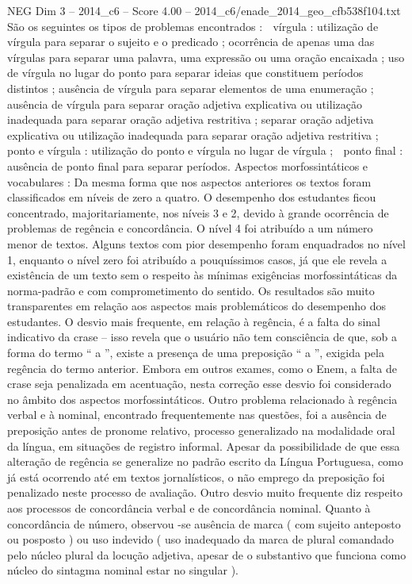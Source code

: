 \begin{textsample}{NEG Dim 3 – 2014\_c6 – Score 4.00 – 2014\_c6/enade\_2014\_geo\_cfb538f104.txt}
São os seguintes os tipos de problemas encontrados :  vírgula : utilização de vírgula para separar o sujeito e o predicado ; ocorrência de apenas uma das vírgulas para separar uma palavra, uma expressão ou uma oração encaixada ; uso de vírgula no lugar do ponto para separar ideias que constituem períodos distintos ; ausência de vírgula para separar elementos de uma enumeração ; ausência de vírgula para separar oração adjetiva explicativa ou utilização inadequada para separar oração adjetiva restritiva ; separar oração adjetiva explicativa ou utilização inadequada para separar oração adjetiva restritiva ;  ponto e vírgula : utilização do ponto e vírgula no lugar de vírgula ;  ponto final : ausência de ponto final para separar períodos.
Aspectos morfossintáticos e vocabulares : Da mesma forma que nos aspectos anteriores os textos foram classificados em níveis de zero a quatro.
O desempenho dos estudantes ficou concentrado, majoritariamente, nos níveis 3 e 2, devido à grande ocorrência de problemas de regência e concordância.
O nível 4 foi atribuído a um número menor de textos.
Alguns textos com pior desempenho foram enquadrados no nível 1, enquanto o nível zero foi atribuído a pouquíssimos casos, já que ele revela a existência de um texto sem o respeito às mínimas exigências morfossintáticas da norma-padrão e com comprometimento do sentido.
Os resultados são muito transparentes em relação aos aspectos mais problemáticos do desempenho dos estudantes.
O desvio mais frequente, em relação à regência, é a falta do sinal indicativo da crase – isso revela que o usuário não tem consciência de que, sob a forma do termo “ a ”, existe a presença de uma preposição “ a ”, exigida pela regência do termo anterior.
Embora em outros exames, como o Enem, a falta de crase seja penalizada em acentuação, nesta correção esse desvio foi considerado no âmbito dos aspectos morfossintáticos.
Outro problema relacionado à regência verbal e à nominal, encontrado frequentemente nas questões, foi a ausência de preposição antes de pronome relativo, processo generalizado na modalidade oral da língua, em situações de registro informal.
Apesar da possibilidade de que essa alteração de regência se generalize no padrão escrito da Língua Portuguesa, como já está ocorrendo até em textos jornalísticos, o não emprego da preposição foi penalizado neste processo de avaliação.
Outro desvio muito frequente diz respeito aos processos de concordância verbal e de concordância nominal.
Quanto à concordância de número, observou -se ausência de marca ( com sujeito anteposto ou posposto ) ou uso indevido ( uso inadequado da marca de plural comandado pelo núcleo plural da locução adjetiva, apesar de o substantivo que funciona como núcleo do sintagma nominal estar no singular ).

\end{textsample}
